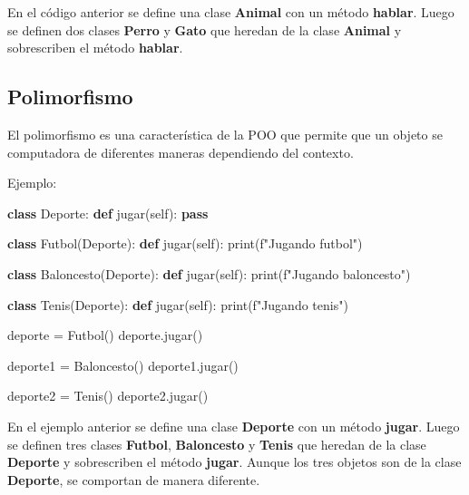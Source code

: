 \documentclass[
  a4paper,
  DIV=11,
  numbers=noendperiod,
  onepage,
  openany]{scrreprt}
\newenvironment{Shaded}{\begin{snugshade}}{\end{snugshade}}
\newcommand{\BuiltInTok}[1]{\textcolor[rgb]{0.00,0.23,0.31}{#1}}
\newcommand{\ControlFlowTok}[1]{\textcolor[rgb]{0.00,0.23,0.31}{\textbf{#1}}}
\newcommand{\KeywordTok}[1]{\textcolor[rgb]{0.00,0.23,0.31}{\textbf{#1}}}
\newcommand{\NormalTok}[1]{\textcolor[rgb]{0.00,0.23,0.31}{#1}}
\newcommand{\OperatorTok}[1]{\textcolor[rgb]{0.37,0.37,0.37}{#1}}
\newcommand{\SpecialStringTok}[1]{\textcolor[rgb]{0.13,0.47,0.30}{#1}}
\newcommand{\VariableTok}[1]{\textcolor[rgb]{0.07,0.07,0.07}{#1}}
\begin{document}
En el código anterior se define una clase \textbf{Animal} con un método
\textbf{hablar}. Luego se definen dos clases \textbf{Perro} y
\textbf{Gato} que heredan de la clase \textbf{Animal} y sobrescriben el
método \textbf{hablar}.

\subsection{Polimorfismo}\label{polimorfismo}

El polimorfismo es una característica de la POO que permite que un
objeto se computadora de diferentes maneras dependiendo del contexto.

Ejemplo:

\begin{Shaded}
\begin{Highlighting}[]
\KeywordTok{class}\NormalTok{ Deporte:}
    \KeywordTok{def}\NormalTok{ jugar(}\VariableTok{self}\NormalTok{):}
        \ControlFlowTok{pass}

\KeywordTok{class}\NormalTok{ Futbol(Deporte):}
    \KeywordTok{def}\NormalTok{ jugar(}\VariableTok{self}\NormalTok{):}
        \BuiltInTok{print}\NormalTok{(}\SpecialStringTok{f"Jugando futbol"}\NormalTok{)}

\KeywordTok{class}\NormalTok{ Baloncesto(Deporte):}
    \KeywordTok{def}\NormalTok{ jugar(}\VariableTok{self}\NormalTok{):}
      \BuiltInTok{print}\NormalTok{(}\SpecialStringTok{f"Jugando baloncesto"}\NormalTok{)}

\KeywordTok{class}\NormalTok{ Tenis(Deporte):}
    \KeywordTok{def}\NormalTok{ jugar(}\VariableTok{self}\NormalTok{):}
      \BuiltInTok{print}\NormalTok{(}\SpecialStringTok{f"Jugando tenis"}\NormalTok{)}

\NormalTok{deporte }\OperatorTok{=}\NormalTok{ Futbol()}
\NormalTok{deporte.jugar()}

\NormalTok{deporte1 }\OperatorTok{=}\NormalTok{ Baloncesto()}
\NormalTok{deporte1.jugar()}

\NormalTok{deporte2 }\OperatorTok{=}\NormalTok{ Tenis()}
\NormalTok{deporte2.jugar()}
\end{Highlighting}
\end{Shaded}

En el ejemplo anterior se define una clase \textbf{Deporte} con un
método \textbf{jugar}. Luego se definen tres clases \textbf{Futbol},
\textbf{Baloncesto} y \textbf{Tenis} que heredan de la clase
\textbf{Deporte} y sobrescriben el método \textbf{jugar}. Aunque los
tres objetos son de la clase \textbf{Deporte}, se comportan de manera
diferente.
\end{document}
